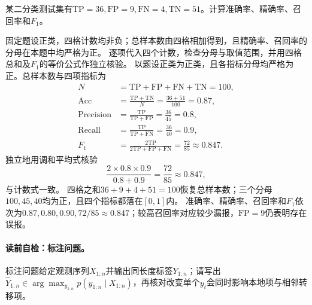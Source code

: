 \label{struct:V1-C11-CH18}
\label{struct:V1-C11-CH32}
\label{struct:V1-C11-CH33}
\begin{example}[混淆矩阵的四项分类指标]\label{exm:V1-C11-binary-metrics}
某二分类测试集有$\mathrm{TP}=36,\mathrm{FP}=9,\mathrm{FN}=4,\mathrm{TN}=51$。计算准确率、精确率、召回率和$F_1$。
\end{example}
\begin{solution}
\SolGiven 固定题设正类，四格计数均非负；总样本数由四格相加得到，且精确率、召回率的分母在本题中均严格为正。
\SolPlan 逐项代入四个计数，检查分母与取值范围，并用四格总和及$F_1$的等价公式作独立核验。
\SolDerive
以题设正类为正类，且各指标分母均严格为正。总样本数与四项指标为
\[
\begin{aligned}
N&=\mathrm{TP}+\mathrm{FP}+\mathrm{FN}+\mathrm{TN}=100,\\
\mathrm{Acc}
  &=\frac{\mathrm{TP}+\mathrm{TN}}{N}
    =\frac{36+51}{100}=0.87,\\
\mathrm{Precision}
  &=\frac{\mathrm{TP}}{\mathrm{TP}+\mathrm{FP}}
    =\frac{36}{45}=0.8,\\
\mathrm{Recall}
  &=\frac{\mathrm{TP}}{\mathrm{TP}+\mathrm{FN}}
    =\frac{36}{40}=0.9,\\
F_1
  &=\frac{2\mathrm{TP}}{2\mathrm{TP}+\mathrm{FP}+\mathrm{FN}}
    =\frac{72}{85}\approx0.847.
\end{aligned}
\]
独立地用调和平均式核验
\[
\frac{2\times0.8\times0.9}{0.8+0.9}
=\frac{72}{85}\approx0.847,
\]
与计数式一致。
\SolCheck 四格之和$36+9+4+51=100$恢复总样本数；三个分母$100,45,40$均为正，且四个指标都落在$[0,1]$内。
\SolAnswer 准确率、精确率、召回率和$F_1$依次为$0.87,0.80,0.90,72/85\approx0.847$；较高召回率对应较少漏报，$\mathrm{FP}=9$仍表明存在误报。
\end{solution}


\paragraph{读前自检：标注问题。}标注问题给定观测序列$X_{1:n}$并输出同长度标签$Y_{1:n}$；请写出$\widehat Y_{1:n}\in\arg\max_{y_{1:n}}p(y_{1:n}\mid X_{1:n})$，再核对改变单个$y_t$会同时影响本地项与相邻转移项。\par

